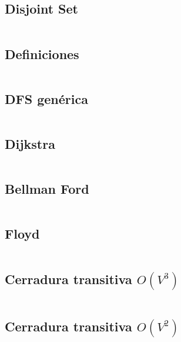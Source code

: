 \documentclass[11pt]{article}
\begin{document}
		\subsection{Disjoint Set}
		\inputminted[tabsize=2,breaklines,firstline=8,lastline=37,fontsize=\small]{c++}{graph.cpp}
		
		\subsection{Definiciones}
		\inputminted[tabsize=2,breaklines,firstline=39,lastline=100,fontsize=\small]{c++}{graph.cpp}
		
		\subsection{DFS genérica}
		\inputminted[tabsize=2,breaklines,firstline=411,lastline=429,fontsize=\small]{c++}{graph.cpp}
		
		\subsection{Dijkstra}
		\inputminted[tabsize=2,breaklines,firstline=102,lastline=125,fontsize=\small]{c++}{graph.cpp}
		
		\subsection{Bellman Ford}
		\inputminted[tabsize=2,breaklines,firstline=127,lastline=161,fontsize=\small]{c++}{graph.cpp}
		
		\subsection{Floyd}
		\inputminted[tabsize=2,breaklines,firstline=167,lastline=175,fontsize=\small]{c++}{graph.cpp}
		
		\subsection{Cerradura transitiva $O(V^3)$}
		\inputminted[tabsize=2,breaklines,firstline=177,lastline=184,fontsize=\small]{c++}{graph.cpp}
		
		\subsection{Cerradura transitiva $O(V^2)$}
		\inputminted[tabsize=2,breaklines,firstline=186,lastline=200,fontsize=\small]{c++}{graph.cpp}
		
\end{document}
